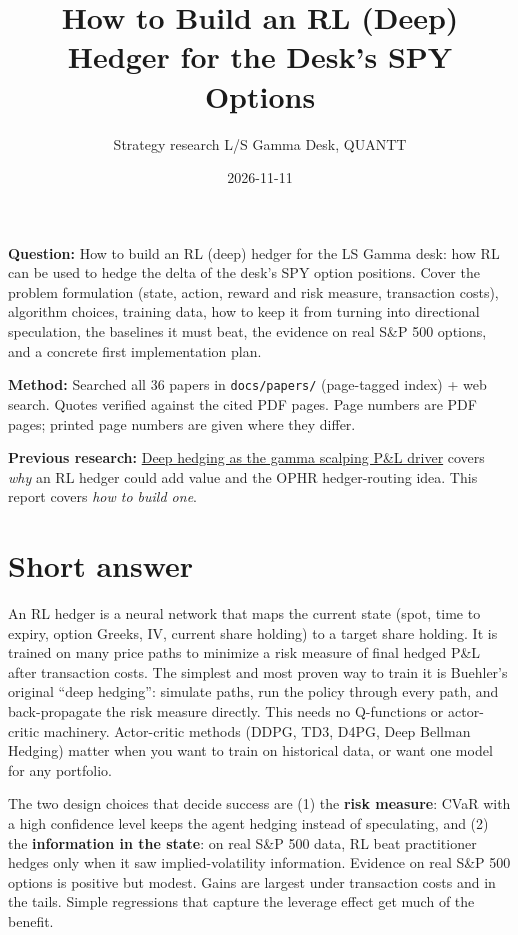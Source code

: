 \documentclass{article}
\title{How to Build an RL (Deep) Hedger for the Desk's SPY Options}
\author{Strategy research \textperiodcentered{} L/S Gamma Desk, QUANTT}
\date{2026-11-11}
\begin{document}
\maketitle

\textbf{Question:} How to build an RL (deep) hedger for the LS Gamma desk: how RL can be used to hedge the delta of the desk's SPY option positions. Cover the problem formulation (state, action, reward and risk measure, transaction costs), algorithm choices, training data, how to keep it from turning into directional speculation, the baselines it must beat, the evidence on real S\&P 500 options, and a concrete first implementation plan.

\textbf{Method:} Searched all 36 papers in \texttt{docs/\allowbreak{}papers/\allowbreak{}} (page-tagged index) + web search. Quotes verified against the cited PDF pages. Page numbers are PDF pages; printed page numbers are given where they differ.

\textbf{Previous research:} \href{2026-09-27-deep-hedging-as-gamma-scalping-pnl-driver.pdf}{Deep hedging as the gamma scalping P\&L driver} covers \emph{why} an RL hedger could add value and the OPHR hedger-routing idea. This report covers \emph{how to build one}.

\section{Short answer}

An RL hedger is a neural network that maps the current state (spot, time to expiry, option Greeks, IV, current share holding) to a target share holding. It is trained on many price paths to minimize a risk measure of final hedged P\&L after transaction costs. The simplest and most proven way to train it is Buehler's original ``deep hedging'': simulate paths, run the policy through every path, and back-propagate the risk measure directly. This needs no Q-functions or actor-critic machinery. Actor-critic methods (DDPG, TD3, D4PG, Deep Bellman Hedging) matter when you want to train on historical data, or want one model for any portfolio.

The two design choices that decide success are (1) the \textbf{risk measure}: CVaR with a high confidence level keeps the agent hedging instead of speculating, and (2) the \textbf{information in the state}: on real S\&P 500 data, RL beat practitioner hedges only when it saw implied-volatility information. Evidence on real S\&P 500 options is positive but modest. Gains are largest under transaction costs and in the tails. Simple regressions that capture the leverage effect get much of the benefit.
\end{document}
